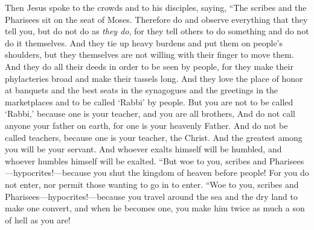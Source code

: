 \begin{biblechapter} %
 Then Jesus spoke to the crowds and to his disciples,
\verse saying, “The scribes and the Pharisees sit on the seat of Moses.
\verse Therefore do and observe everything that they tell you, but do not do as \textit{they do}, for they tell others to do something and do not do it themselves.
\verse And they tie up heavy burdens and put them on people’s shoulders, but they themselves are not willing with their finger to move them.
\verse And they do all their deeds in order to be seen by people, for they make their phylacteries broad and make their tassels long.
\verse And they love the place of honor at banquets and the best seats in the synagogues
\verse and the greetings in the marketplaces and to be called ‘Rabbi’ by people.
\verse But you are not to be called ‘Rabbi,’ because one is your teacher, and you are all brothers,
\verse And do not call anyone your father on earth, for one is your heavenly Father.
\verse And do not be called teachers, because one is your teacher, the Christ.
\verse And the greatest among you will be your servant.
\verse And whoever exalts himself will be humbled, and whoever humbles himself will be exalted.
\verse “But woe to you, scribes and Pharisees—hypocrites!—because you shut the kingdom of heaven before people! For you do not enter, nor permit those wanting to go in to enter.
\verse “Woe to you, scribes and Pharisees—hypocrites!—because you travel around the sea and the dry land to make one convert, and when he becomes one, you make him twice as much a son of hell as you are!

\end{biblechapter}
